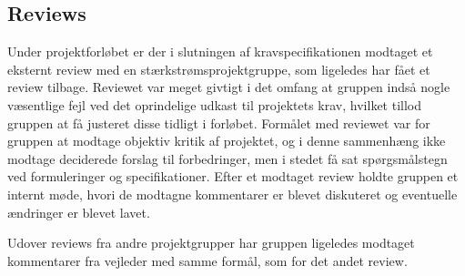 \subsection{Reviews}
Under projektforløbet er der i slutningen af kravspecifikationen modtaget et eksternt review\cite{lib:Review1} med en stærkstrømsprojektgruppe, som ligeledes har fået et review tilbage.
Reviewet var meget givtigt i det omfang at gruppen indså nogle væsentlige fejl ved det oprindelige udkast til projektets krav, hvilket tillod gruppen at få justeret disse tidligt i forløbet.
Formålet med reviewet var for gruppen at modtage objektiv kritik af projektet, og i denne sammenhæng ikke modtage deciderede forslag til forbedringer, men i stedet få sat spørgsmålstegn ved formuleringer og specifikationer.
Efter et modtaget review holdte gruppen et internt møde, hvori de modtagne kommentarer er blevet diskuteret og eventuelle ændringer er blevet lavet.

Udover reviews fra andre projektgrupper har gruppen ligeledes modtaget kommentarer fra vejleder med samme formål, som for det andet review.

\clearpage